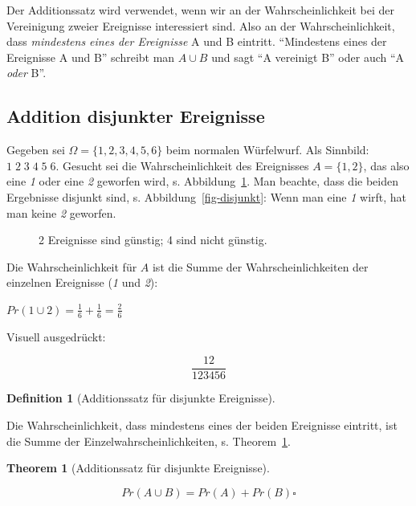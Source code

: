 \documentclass[
  ngerman,
  letterpaper,
  twoside,
  open=any]{scrbook}
\theoremstyle{definition}
\theoremstyle{plain}
\newtheorem{theorem}{Theorem}[chapter]
\theoremstyle{definition}
\theoremstyle{definition}
\newtheorem{definition}{Definition}[chapter]
\theoremstyle{definition}
\theoremstyle{definition}
\theoremstyle{remark}
\begin{document}
Der Additionssatz wird verwendet, wenn wir an der Wahrscheinlichkeit bei
der Vereinigung zweier Ereignisse interessiert sind. Also an der
Wahrscheinlichkeit, dass \emph{mindestens eines der Ereignisse} A und B
eintritt. \enquote{Mindestens eines der Ereignisse A und B} schreibt man
\(A \cup B\) und sagt \enquote{A vereinigt B} oder auch \enquote{A
\emph{oder} B}.

\subsection{Addition disjunkter
Ereignisse}\label{addition-disjunkter-ereignisse}

Gegeben sei \(\Omega = \{1,2,3,4,5,6\}\) beim normalen Würfelwurf. Als
Sinnbild: \(\boxed{1\; 2\; 3\; 4\; 5\; 6}\). Gesucht sei die
Wahrscheinlichkeit des Ereignisses \(A=\{1,2\}\), das also eine \emph{1}
oder eine \emph{2} geworfen wird, s. Abbildung~\ref{fig-addition-boxed}.
Man beachte, dass die beiden Ergebnisse disjunkt sind, s.
Abbildung~\ref{fig-disjunkt}: Wenn man eine \emph{1} wirft, hat man
keine \emph{2} geworfen.

\begin{figure}[H]


\caption{\label{fig-addition-boxed}2 Ereignisse sind günstig; 4 sind
nicht günstig.}

\end{figure}%

Die Wahrscheinlichkeit für \(A\) ist die Summe der Wahrscheinlichkeiten
der einzelnen Ereignisse (\emph{1} und \emph{2}):

\(Pr(1 \cup 2) = \frac{1}{6} + \frac{1}{6} = \frac{2}{6}\)

Visuell ausgedrückt:

\[\frac{\boxed{12}}{\boxed{123456}}\]

\begin{definition}[Additionssatz für disjunkte
Ereignisse]\protect\hypertarget{def-add-disjunkt}{}\label{def-add-disjunkt}

Die Wahrscheinlichkeit, dass mindestens eines der beiden Ereignisse
eintritt, ist die Summe der Einzelwahrscheinlichkeiten, s.
Theorem~\ref{thm-add-disjunkt}.

\end{definition}

\begin{theorem}[Additionssatz für disjunkte
Ereignisse]\protect\hypertarget{thm-add-disjunkt}{}\label{thm-add-disjunkt}

\[Pr(A \cup B) = Pr(A) + Pr(B) \square\]

\end{theorem}
\end{document}
